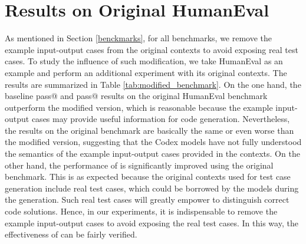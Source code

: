 \section{Results on Original HumanEval}
\label{sec:appendix_origial_humaneval}
\begin{table}[t]
    \centering
    \caption{Pass@ () on the original HumanEval benchmark with Codex models. The numbers in {\textcolor{orange}{orange}} indicate the absolute improvements of pass@ on the original benchmark over our modified benchmark in Table \ref{tab:main}. 
}
    \label{tab:modified_benchmark}
\end{table}
As mentioned in Section \ref{benckmarks}, for all benchmarks, we remove the example input-output cases from the original contexts to avoid exposing real test cases. To study the influence of such modification, we take HumanEval as an example and perform an additional experiment with its original contexts. The results are summarized in Table \ref{tab:modified_benchmark}.
On the one hand, the baseline pass@ and pass@ results on the original HumanEval benchmark outperform the modified version, which is reasonable because the example input-output cases may provide useful information for code generation. Nevertheless, the  results on the original benchmark are basically the same or even worse than the modified version, suggesting that the Codex models have not fully understood the semantics of the example input-output cases provided in the contexts. 
On the other hand, the performance of \ours is significantly improved using the original benchmark. This is as expected because the original contexts used for test case generation include real test cases, which could be borrowed by the models during the generation. Such real test cases will greatly empower \ours to distinguish correct code solutions. Hence, in our experiments, it is indispensable to remove the example input-output cases to avoid exposing the real test cases. In this way, the effectiveness of \ours can be fairly verified.

